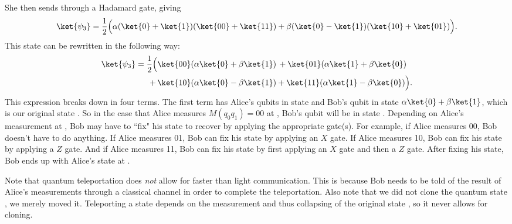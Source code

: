 She then sends  through a Hadamard gate, giving
\begin{equation}
  \ket{\psi_3} = \dfrac{1}{2}\Big(\alpha(\ket{0} + \ket{1})(\ket{00} + \ket{11}) + \beta(\ket{0} - \ket{1})(\ket{10} + \ket{01})\Big).
\end{equation}
This state can be rewritten in the following way:
\begin{equation}
  \begin{aligned}
    \ket{\psi_3} = \dfrac{1}{2}\Big(&\ket{00}(\alpha\ket{0} + \beta{\ket{1}}) \, + \ket{01}(\alpha\ket{1} + \beta\ket{0}) \\
    + \, &\ket{10}(\alpha\ket{0} - \beta\ket{1}) + \ket{11}(\alpha\ket{1} - \beta\ket{0})\Big).
  \end{aligned}
\end{equation}
This expression breaks down in four terms. The first term has Alice's qubits in state  and Bob's qubit in state $\alpha\ket{0} + \beta\ket{1}$, which is our original state \ket{\phi}. So in the case that Alice measures $M(q_0q_1) = 00$ at , Bob's qubit will be in state \ket{\phi}. Depending on Alice's measurement at , Bob may have to ``fix" his state to recover \ket{\phi} by applying the appropriate gate(s). For example, if Alice measures 00, Bob doesn't have to do anything. If Alice measures 01, Bob can fix his state by applying an $X$ gate. If Alice measures 10, Bob can fix his state by applying a $Z$ gate. And if Alice measures 11, Bob can fix his state by first applying an $X$ gate and then a $Z$ gate. After fixing his state, Bob ends up with Alice's state \ket{\phi} at .

Note that quantum teleportation does \emph{not} allow for faster than light communication. This is because Bob needs to be told of the result of Alice's measurements through a classical channel in order to complete the teleportation. Also note that we did not clone the quantum state \ket{\phi}, we merely moved it. Teleporting a state depends on the measurement and thus collapsing of the original state \ket{\phi}, so it never allows for cloning.
